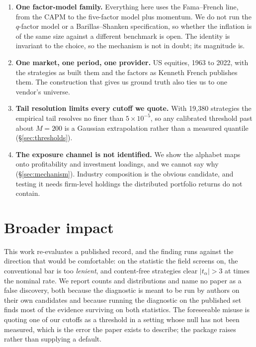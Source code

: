 \documentclass{article}
\begin{document}
\begin{enumerate}
\bzoosubpopFfSdLowVw{} to \bzoosubpopFfSdHighVw{} on the five-factor alpha
value-weighted --- and not to two decimal places. It also drifts across the sample, and an
expanding-window check shows a calibration fitted on the first half transfers
imperfectly to the second --- helping in one weighting and hurting in the other
(\S\ref{sec:robust}). A conditional calibration is the right object and we have
not built one.
\item \textbf{One factor-model family.} Everything here uses the
Fama--French line, from the CAPM to the five-factor model plus momentum. We do
not run the $q$-factor model or a Barillas--Shanken specification, so whether
the inflation is of the same size against a different benchmark is open. The
identity is invariant to the choice, so the mechanism is not in doubt; its
magnitude is.
\item \textbf{One market, one period, one provider.} US equities, 1963 to
2022, with the strategies as \citet{chen2025htap} built them and the factors as
Kenneth French publishes them. The construction that gives us ground truth also
ties us to one vendor's universe.
\item \textbf{Tail resolution limits every cutoff we quote.} With 19{,}380
strategies the empirical tail resolves no finer than $5\times 10^{-5}$, so any
calibrated threshold past about $M = 200$ is a Gaussian extrapolation rather
than a measured quantile (\S\ref{sec:thresholds}).
\item \textbf{The exposure channel is not identified.} We show the alphabet
maps onto profitability and investment loadings, and we cannot say why
(\S\ref{sec:mechanism}). Industry composition is the obvious candidate, and
testing it needs firm-level holdings the distributed portfolio returns do not
contain.
\end{enumerate}

\section{Broader impact}

This work re-evaluates a published record, and the finding runs against the
direction that would be comfortable: on the statistic the field screens on, the
conventional bar is too \emph{lenient}, and content-free strategies clear
$|t_\alpha|>3$ at \bzooamTimesNominal{} times the nominal rate. We report
counts and distributions and name no paper as a false discovery, both because
the diagnostic is meant to be run by authors on their own candidates and
because running the diagnostic on the published set finds most of the evidence
surviving on both statistics. The foreseeable misuse is quoting one of our
cutoffs as a threshold in a setting whose null has not been measured, which is
the error the paper exists to describe; the package raises rather than
supplying a default.
\end{document}
